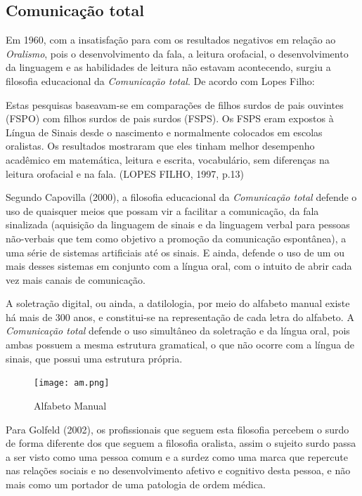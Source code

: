 \documentclass[brasil]{abnt}
\begin{document}
		\subsection{Comunicação total}
		Em 1960, com a insatisfação para com os resultados negativos em relação ao \textit{Oralismo}, pois o desenvolvimento da fala, a leitura orofacial, o desenvolvimento da linguagem e as habilidades de 
		leitura não estavam acontecendo, surgiu a filosofia educacional da \textit{Comunicação total}. De acordo com Lopes Filho:
		
			\begin{citacao} Estas pesquisas baseavam-se em comparações de filhos surdos de pais ouvintes (FSPO) com filhos surdos de pais surdos (FSPS). Os FSPS eram expostos à Língua de Sinais desde o 
							nascimento e normalmente colocados em escolas oralistas. Os resultados mostraram que eles tinham melhor desempenho acadêmico em matemática, leitura e escrita, vocabulário, sem 
							diferenças na leitura orofacial e na fala. (LOPES FILHO, 1997, p.13)
			\end{citacao}
		  
		 Segundo Capovilla (2000), a filosofia educacional da \textit{Comunicação total} defende o uso de quaisquer meios que possam vir a facilitar a comunicação, da fala sinalizada (aquisição da linguagem 
		 de sinais e da linguagem verbal para pessoas não-verbais que tem como objetivo a promoção da comunicação espontânea), a uma série de sistemas artificiais até os sinais. E ainda, defende o uso de um 
		 ou mais desses sistemas em conjunto com a língua oral, com o intuito de abrir cada vez mais canais de comunicação.
		 
		 A soletração digital, ou ainda, a datilologia, por meio do alfabeto manual existe há mais de 300 anos, e constitui-se na representação de cada letra do alfabeto. 
		 A \textit{Comunicação total} defende o uso simultâneo da soletração e da língua oral, pois ambas possuem a mesma estrutura gramatical, o que não ocorre com a língua de sinais, que possui uma estrutura
		 própria.
		 
				\begin{figure}[!htb]
						\center
						\texttt{[image: am.png]}
						\caption{Alfabeto Manual}
				\end{figure}
		 
		 Para Golfeld (2002), os profissionais que seguem esta filosofia percebem o surdo de forma diferente dos que seguem a filosofia oralista, assim o sujeito surdo passa a ser visto como uma pessoa comum 
		 e a surdez como uma marca que repercute nas relações sociais e no desenvolvimento afetivo e cognitivo desta pessoa, e não mais como um portador de uma patologia de ordem médica.
		 
\end{document}
